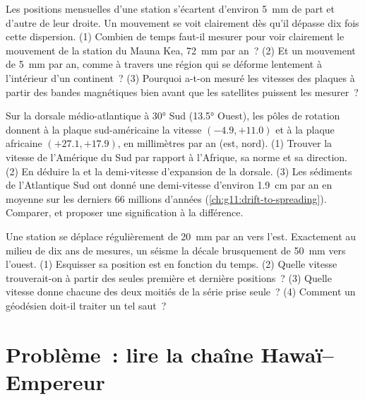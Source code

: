 \begin{exercise}[$\star\star\star$]\label{exo:g11:plate-motions:13}
Les positions mensuelles d'une station s'écartent d'environ \qty{5}{mm} de
part et d'autre de leur droite. Un mouvement se voit clairement dès qu'il
dépasse dix fois cette dispersion. (1) Combien de temps faut-il mesurer pour
voir clairement le mouvement de la station du Mauna Kea, \qty{72}{mm} par
an~? (2) Et un mouvement de \qty{5}{mm} par an, comme à travers une région
qui se déforme lentement à l'intérieur d'un continent~? (3) Pourquoi a-t-on
mesuré les vitesses des plaques à partir des bandes magnétiques bien avant
que les satellites puissent les mesurer~?
\end{exercise}

\begin{exercise}[$\star\star\star$]\label{exo:g11:plate-motions:14}
Sur la dorsale médio-atlantique à \ang{30} Sud (\ang{13.5} Ouest), les pôles
de rotation donnent à la plaque sud-américaine la vitesse $(-4.9, +11.0)$ et
à la plaque africaine $(+27.1, +17.9)$, en millimètres par an (est, nord).
(1) Trouver la vitesse de l'Amérique du Sud par rapport à l'Afrique, sa
norme et sa direction. (2) En déduire la  et la
demi-vitesse d'expansion de la dorsale. (3) Les sédiments de l'Atlantique
Sud ont donné une demi-vitesse d'environ \qty{1.9}{cm} par an en moyenne
sur les derniers 66 millions d'années (\cref{ch:g11:drift-to-spreading}).
Comparer, et proposer une signification à la différence.
\end{exercise}

\begin{exercise}[$\star\star\star$]\label{exo:g11:plate-motions:15}
Une station se déplace régulièrement de \qty{20}{mm} par an vers l'est.
Exactement au milieu de dix ans de mesures, un séisme la décale brusquement
de \qty{50}{mm} vers l'ouest. (1) Esquisser sa position est en fonction du
temps. (2) Quelle vitesse trouverait-on à partir des seules première et
dernière positions~? (3) Quelle vitesse donne chacune des deux moitiés de
la série prise seule~? (4) Comment un géodésien doit-il traiter un tel
saut~?
\end{exercise}

\section{Problème~: lire la chaîne Hawaï--Empereur}

